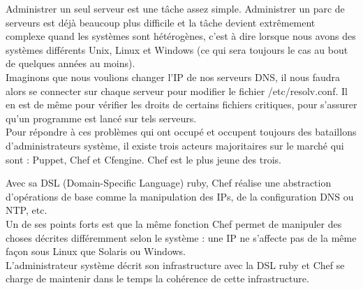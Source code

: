 Administrer un seul serveur est une tâche assez simple. Administrer un parc de
serveurs est déjà beaucoup plus difficile et la tâche devient extrêmement
complexe quand les systèmes sont hétérogènes, c'est à dire lorsque nous avons
des systèmes différents Unix, Linux et Windows (ce qui sera toujours le cas au
bout de quelques années au moins).\\

Imaginons que nous voulions changer l'IP de nos serveurs DNS, il nous faudra
alors se connecter sur chaque serveur pour modifier le fichier
/etc/resolv.conf. Il en est de même pour vérifier les droits de certains
fichiers critiques, pour s'assurer qu'un programme est lancé sur tels
serveurs.\\

Pour répondre à ces problèmes qui ont occupé et occupent toujours des bataillons
d'administrateurs système, il existe trois acteurs majoritaires sur le marché
qui sont : Puppet, Chef et Cfengine. Chef est le plus jeune des trois. 

Avec sa DSL (Domain-Specific Language) ruby, Chef réalise une abstraction
d'opérations de base comme la manipulation des IPs, de la configuration DNS ou
NTP, etc. \\
Un de ses points forts est que la même fonction Chef permet de manipuler des
choses décrites différemment selon le système : une IP ne s'affecte pas de la
même façon sous Linux que Solaris ou Windows.\\
L'administrateur système décrit son infrastructure avec la DSL ruby et Chef
se charge de maintenir dans le temps la cohérence de cette infrastructure.





